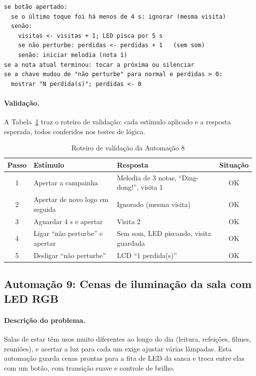 \documentclass[12pt]{article}
\begin{document}
\begin{lstlisting}[style=algo]
se botão apertado:
  se o último toque foi há menos de 4 s: ignorar (mesma visita)
  senão:
    visitas <- visitas + 1; LED pisca por 5 s
    se não perturbe: perdidas <- perdidas + 1   (sem som)
    senão: iniciar melodia (nota 1)
se a nota atual terminou: tocar a próxima ou silenciar
se a chave mudou de "não perturbe" para normal e perdidas > 0:
  mostrar "N perdida(s)"; perdidas <- 0
\end{lstlisting}

\paragraph{Validação.} A Tabela~\ref{tab:val8} traz o roteiro de validação: cada estímulo aplicado e a resposta esperada, todos conferidos nos testes de lógica.

\begin{table}[ht]
\centering
\caption{Roteiro de validação da Automação 8}\label{tab:val8}
\footnotesize
\begin{tabularx}{\textwidth}{cXXc}
\toprule
Passo & Estímulo & Resposta & Situação \\
\midrule
1 & Apertar a campainha & Melodia de 3 notas, ``Ding-dong!'', visita 1 & OK \\
2 & Apertar de novo logo em seguida & Ignorado (mesma visita) & OK \\
3 & Aguardar 4 s e apertar & Visita 2 & OK \\
4 & Ligar ``não perturbe'' e apertar & Sem som, LED piscando, visita guardada & OK \\
5 & Desligar ``não perturbe'' & LCD ``1 perdida(s)'' & OK \\
\bottomrule
\end{tabularx}
\end{table}

\subsection{Automação 9: Cenas de iluminação da sala com LED RGB}\label{sub:a9}

\paragraph{Descrição do problema.} Salas de estar têm usos muito diferentes ao longo do dia (leitura, refeições, filmes, reuniões), e acertar a luz para cada um exige ajustar várias lâmpadas. Esta automação guarda cenas prontas para a fita de LED da sanca e troca entre elas com um botão, com transição suave e controle de brilho.
\end{document}
